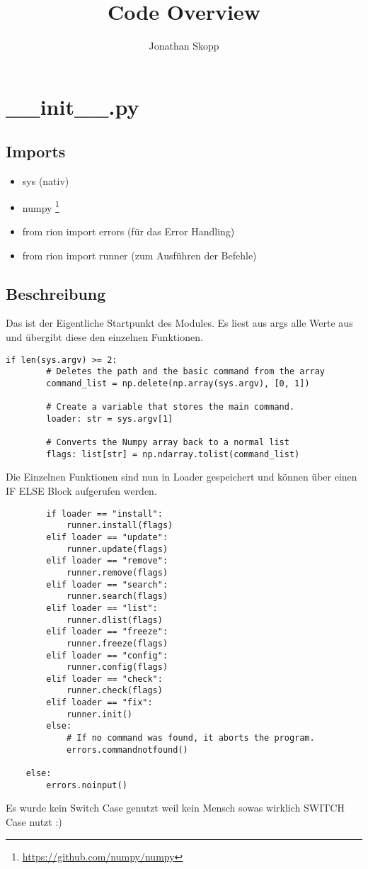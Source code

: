 \documentclass[fleqn,10pt]{olplainarticle}
\title{Code Overview}
\author{Jonathan Skopp}
\affil{jonathan-erik.skopp@tu-ilmenau.de}
\begin{document}
\flushbottom
\maketitle
\thispagestyle{empty}


\section{\_\_init\_\_.py}
\subsection{Imports}
\begin{itemize}
    \item sys (nativ)
    \item numpy \footnote{\url{https://github.com/numpy/numpy}}
    \item from rion import errors (für das Error Handling)
    \item from rion import runner (zum Ausführen der Befehle)
\end{itemize}
\subsection{Beschreibung}
Das ist der Eigentliche Startpunkt des Modules. Es liest aus args alle Werte aus und übergibt diese den einzelnen Funktionen.
\begin{lstlisting}
if len(sys.argv) >= 2:
        # Deletes the path and the basic command from the array
        command_list = np.delete(np.array(sys.argv), [0, 1])

        # Create a variable that stores the main command.
        loader: str = sys.argv[1]

        # Converts the Numpy array back to a normal list
        flags: list[str] = np.ndarray.tolist(command_list)
\end{lstlisting}
Die Einzelnen Funktionen sind nun in Loader gespeichert und können über einen IF ELSE Block aufgerufen werden.
\begin{lstlisting}
        if loader == "install":
            runner.install(flags)
        elif loader == "update":
            runner.update(flags)
        elif loader == "remove":
            runner.remove(flags)
        elif loader == "search":
            runner.search(flags)
        elif loader == "list":
            runner.dlist(flags)
        elif loader == "freeze":
            runner.freeze(flags)
        elif loader == "config":
            runner.config(flags)
        elif loader == "check":
            runner.check(flags)
        elif loader == "fix":
            runner.init()
        else:
            # If no command was found, it aborts the program.
            errors.commandnotfound()

    else:
        errors.noinput()
\end{lstlisting}
Es wurde kein Switch Case genutzt weil kein Mensch sowas wirklich SWITCH Case nutzt :)
\end{document}
